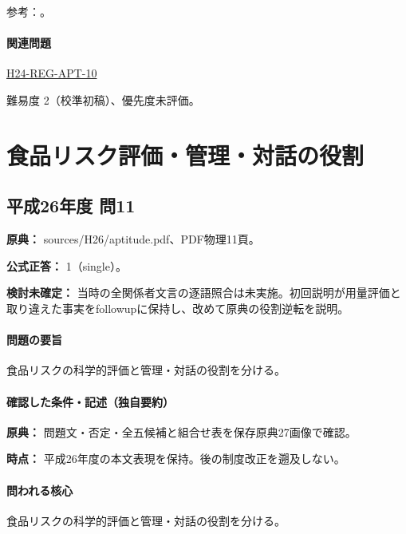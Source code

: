 \par 参考：\cite{saf_ra2006,saf_fsc_psych}。

\paragraph{関連問題} \hyperref[q:h24-reg-apt-10]{H24-REG-APT-10}

\par 難易度 2（校準初稿）、優先度未評価。

\section{食品リスク評価・管理・対話の役割}

\subsection{平成26年度 問11}
\label{q:h26-reg-apt-11}

\noindent\textbf{原典：} sources/H26/aptitude.pdf、PDF物理11頁。

\textbf{公式正答：} 1（single）。

\par\textbf{検討未確定：} 当時の全関係者文言の逐語照合は未実施。初回説明が用量評価と取り違えた事実をfollowupに保持し、改めて原典の役割逆転を説明。

\paragraph{問題の要旨} 食品リスクの科学的評価と管理・対話の役割を分ける。

\paragraph{確認した条件・記述（独自要約）}\mbox{}\par

\noindent\textbf{原典：} 問題文・否定・全五候補と組合せ表を保存原典27画像で確認。\par

\noindent\textbf{時点：} 平成26年度の本文表現を保持。後の制度改正を遡及しない。\par

\paragraph{問われる核心} 食品リスクの科学的評価と管理・対話の役割を分ける。

